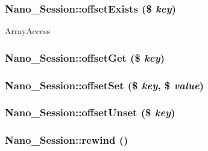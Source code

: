 \hypertarget{classNano__Session_3dc380b6f608b1034c37f66c92981fe2}{
\subsubsection[{offsetExists}]{\setlength{\rightskip}{0pt plus 5cm}Nano\_\-Session::offsetExists (\$ {\em key})}}
\label{classNano__Session_3dc380b6f608b1034c37f66c92981fe2}


ArrayAccess \hypertarget{classNano__Session_83a62bc7ea13ea1b099a1a574f82a6ef}{
\subsubsection[{offsetGet}]{\setlength{\rightskip}{0pt plus 5cm}Nano\_\-Session::offsetGet (\$ {\em key})}}
\label{classNano__Session_83a62bc7ea13ea1b099a1a574f82a6ef}


\hypertarget{classNano__Session_27a6c0d7c9d5d889710d5199764c53fc}{
\subsubsection[{offsetSet}]{\setlength{\rightskip}{0pt plus 5cm}Nano\_\-Session::offsetSet (\$ {\em key}, \/  \$ {\em value})}}
\label{classNano__Session_27a6c0d7c9d5d889710d5199764c53fc}


\hypertarget{classNano__Session_161d591f72fa5a75b18a66316fb23265}{
\subsubsection[{offsetUnset}]{\setlength{\rightskip}{0pt plus 5cm}Nano\_\-Session::offsetUnset (\$ {\em key})}}
\label{classNano__Session_161d591f72fa5a75b18a66316fb23265}


\hypertarget{classNano__Session_e904ede4af552be1515246169b33792a}{
\subsubsection[{rewind}]{\setlength{\rightskip}{0pt plus 5cm}Nano\_\-Session::rewind ()}}
\label{classNano__Session_e904ede4af552be1515246169b33792a}


